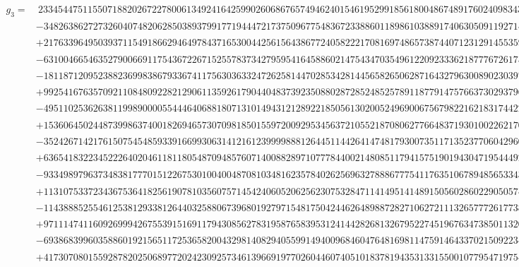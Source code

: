 \documentclass[preprint,12pt,authoryear]{elsarticle}
\begin{document}
{\tiny
\begin{align*}
  g_3=&~2334544751155071882026722780061349241642599026068676574946240154619529918561800486748917602409834307249946624x_5^{25}\\
  &-34826386272732604074820628503893799177194447217375096775483672338860118986103889174063050911927141610810379520x_5^{24}\\
  &+217633964950393711549186629464978437165300442561564386772405822217081697486573874407123129145535922950706091648x_5^{23}\\
  &-631004665463527900669117543672267152557837342795954164588602147543470354961220923336218777672617507047396540736x_5^{22}\\
  &-181187120952388236998386793367411756303633247262581447028534281445658265062871643279630089023039796374318343072x_5^{21}\\
  &+9925416763570921108480922821290611359261790440483739235088028728524852578911877914757663730293796516424536982112x_5^{20}\\
  &-49511025362638119989000055444640688180713101494312128922185056130200524969006756798221621831744228717747164071536x_5^{19}\\
  &+153606450244873998637400182694657307098185015597200929534563721055218708062776648371930100226217096327071566507812x_5^{18}\\
  &-352426714217615075454859339166993063141216123999988812644511442641474817930073511713523770604296026296813438396088x_5^{17}\\
  &+636541832234522264020461181180548709485760714008828971077784400214808511794157519019430471954449244547200377722358x_5^{16}\\
  &-933498979637348381777015122675301004004870810348162357840262569632788867775411763510678948565334319576360783673102x_5^{15}\\
  &+1131075337234367536418256190781035607571454240605206256230753284711414951414891505602860229050574408650155226782728x_5^{14}\\
  &-1143888525546125381293381264403258806739680192797154817504244626489887282710627211132657772617738453443292075022774x_5^{13}\\
  &+971114741160926999426755391516911794308562783195876583953124144282681326795227451967634738501132063379159602305106x_5^{12}\\
  &-693868399603588601921565117253658200432981408294055991494009684604764816981147591464337021509223488254637528974415x_5^{11}\\
  &+417307080155928782025068977202423092573461396691977026044607405101837819435313315500107795471975427014871318266976x_5^{10}\\

\end{align*}}
\end{document}
